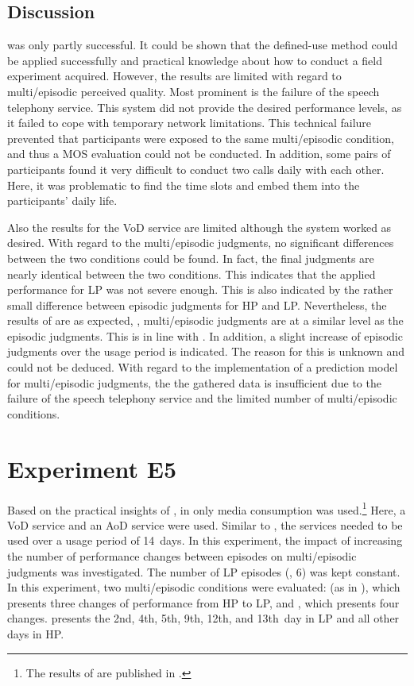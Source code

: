 \subsection{Discussion}
 was only partly successful.
It could be shown that the defined-use method could be applied successfully and practical knowledge about how to conduct a field experiment acquired.
However, the results are limited with regard to multi\-/episodic perceived quality.
Most prominent is the failure of the speech telephony service.
This system did not provide the desired performance levels, as it failed to cope with temporary network limitations.
This technical failure prevented that participants were exposed to the same multi\-/episodic condition, and thus a \ac{MOS} evaluation could not be conducted.
In addition, some pairs of participants found it very difficult to conduct two calls daily with each other.
Here, it was problematic to find the time slots and embed them into the participants' daily life.

Also the results for the \ac{VoD} service are limited although the system worked as desired.
With regard to the multi\-/episodic judgments, no significant differences between the two conditions could be found.
In fact, the final judgments are nearly identical between the two conditions.
This indicates that the applied performance for \ac{LP} was not severe enough.
This is also indicated by the rather small difference between episodic judgments for \ac{HP} and \ac{LP}.
Nevertheless, the results of  are as expected, \ie, multi\-/episodic judgments are at a similar level as the episodic judgments.
This is in line with \citet{moller_single-call_2011}.
In addition, a slight increase of episodic judgments over the usage period is indicated.
The reason for this is unknown and could not be deduced.
With regard to the implementation of a prediction model for multi\-/episodic judgments, the the gathered data is insufficient due to the failure of the speech telephony service and the limited number of multi\-/episodic conditions.

\section{Experiment E5}
Based on the practical insights of , in  only media consumption was used.\footnote{The results of  are published in \citet{guse_modelling_2014}.}
Here, a \ac{VoD} service and an \ac{AoD} service were used.
Similar to , the services needed to be used over a usage period of 14~days.
In this experiment, the impact of increasing the number of performance changes between episodes on multi\-/episodic judgments was investigated.
The number of \ac{LP} episodes (\ie, 6) was kept constant.
In  this experiment, two multi\-/episodic conditions were evaluated:  (as in ), which presents three changes of performance from \ac{HP} to \ac{LP}, and \CX{}\label{C10}, which presents four changes.
\CX{} presents the 2nd, 4th, 5th, 9th, 12th, and 13th~day in \ac{LP} and all other days in \ac{HP}.

